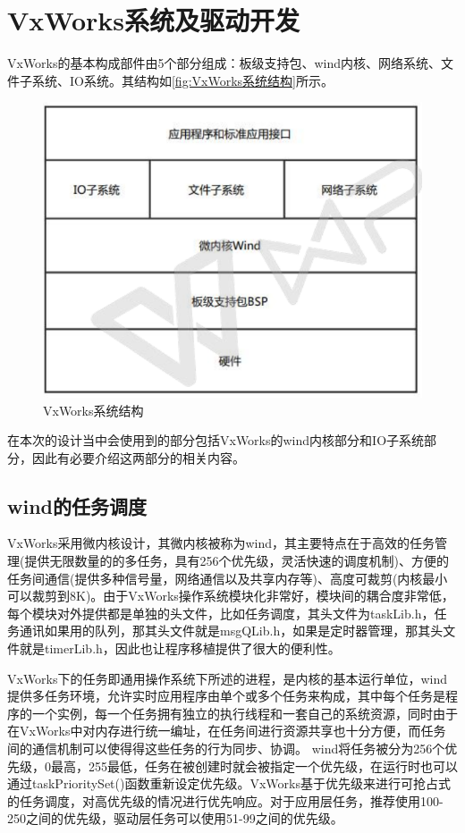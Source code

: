 \section{VxWorks系统及驱动开发}

		
	VxWorks的基本构成部件由5个部分组成：板级支持包、wind内核、网络系统、文件子系统、IO系统。其结构如\autoref{fig:VxWorks系统结构}所示。
\begin{figure}[!h]
\centering
\includegraphics[width=.7\textwidth]{./graphics/VxWorks-sys-structure.pdf}
\caption{VxWorks系统结构}\label{fig:VxWorks系统结构}
\end{figure}

在本次的设计当中会使用到的部分包括VxWorks的wind内核部分和IO子系统部分，因此有必要介绍这两部分的相关内容。
	
\subsection{wind的任务调度}
	VxWorks采用微内核设计，其微内核被称为wind，其主要特点在于高效的任务管理(提供无限数量的的多任务，具有256个优先级，灵活快速的调度机制)、方便的任务间通信(提供多种信号量，网络通信以及共享内存等)、高度可裁剪(内核最小可以裁剪到8K)。由于VxWorks操作系统模块化非常好，模块间的耦合度非常低，每个模块对外提供都是单独的头文件，比如任务调度，其头文件为taskLib.h，任务通讯如果用的队列，那其头文件就是msgQLib.h，如果是定时器管理，那其头文件就是timerLib.h，因此也让程序移植提供了很大的便利性。	
	
	VxWorks下的任务即通用操作系统下所述的进程，是内核的基本运行单位，wind提供多任务环境，允许实时应用程序由单个或多个任务来构成，其中每个任务是程序的一个实例，每一个任务拥有独立的执行线程和一套自己的系统资源，同时由于在VxWorks中对内存进行统一编址，在任务间进行资源共享也十分方便，而任务间的通信机制可以使得得这些任务的行为同步、协调。
	wind将任务被分为256个优先级，0最高，255最低，任务在被创建时就会被指定一个优先级，在运行时也可以通过taskPrioritySet()函数重新设定优先级。VxWorks基于优先级来进行可抢占式的任务调度，对高优先级的情况进行优先响应。对于应用层任务，推荐使用100-250之间的优先级，驱动层任务可以使用51-99之间的优先级。
	
